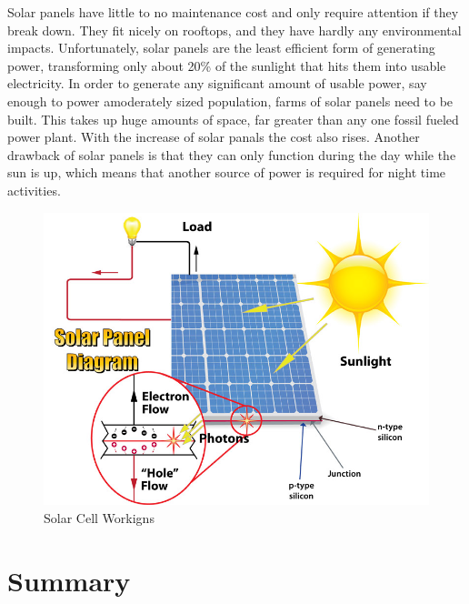 \documentclass[msc,oneside]{ubcthesis}%
\begin{document}
Solar panels have little to no maintenance cost and only require attention if they break down. They fit nicely on rooftops, and they have hardly any 
environmental impacts. Unfortunately, solar panels are the least efficient form of generating power, transforming  only about 20\% of the sunlight that hits them into usable electricity. In order to generate any significant amount of usable power, say enough to power amoderately sized population, farms of solar panels need to be built. This takes up huge amounts of space, far greater than any one fossil fueled power plant. With the increase of solar panals the cost also rises. Another drawback of solar panels is that they can only function during the day while the sun is up, which means that another source of power is required for night time activities. 
\bigskip
\begin{figure}[hbt]\label{solarCell}
  \begin{center}
    \includegraphics[width=1\textwidth]{Solar2}
    \caption[Solar Cell Workings]{ Solar Cell Workigns \cite{Solar}}
  \end{center}
\end{figure}


\section{Summary}
\end{document}
